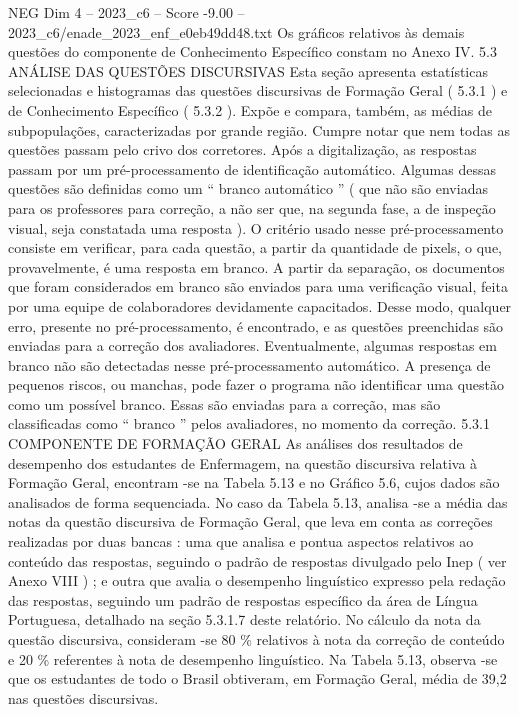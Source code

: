 \begin{textsample}{NEG Dim 4 – 2023\_c6 – Score -9.00 – 2023\_c6/enade\_2023\_enf\_e0eb49dd48.txt}
Os gráficos relativos às demais questões do componente de Conhecimento Específico constam no Anexo IV. 5.3 ANÁLISE DAS QUESTÕES DISCURSIVAS Esta seção apresenta estatísticas selecionadas e histogramas das questões discursivas de Formação Geral ( 5.3.1 ) e de Conhecimento Específico ( 5.3.2 ).
Expõe e compara, também, as médias de subpopulações, caracterizadas por grande região.
Cumpre notar que nem todas as questões passam pelo crivo dos corretores.
Após a digitalização, as respostas passam por um pré-processamento de identificação automático.
Algumas dessas questões são definidas como um “ branco automático ” ( que não são enviadas para os professores para correção, a não ser que, na segunda fase, a de inspeção visual, seja constatada uma resposta ).
O critério usado nesse pré-processamento consiste em verificar, para cada questão, a partir da quantidade de pixels, o que, provavelmente, é uma resposta em branco.
A partir da separação, os documentos que foram considerados em branco são enviados para uma verificação visual, feita por uma equipe de colaboradores devidamente capacitados.
Desse modo, qualquer erro, presente no pré-processamento, é encontrado, e as questões preenchidas são enviadas para a correção dos avaliadores.
Eventualmente, algumas respostas em branco não são detectadas nesse pré-processamento automático.
A presença de pequenos riscos, ou manchas, pode fazer o programa não identificar uma questão como um possível branco.
Essas são enviadas para a correção, mas são classificadas como “ branco ” pelos avaliadores, no momento da correção. 5.3.1 COMPONENTE DE FORMAÇÃO GERAL As análises dos resultados de desempenho dos estudantes de Enfermagem, na questão discursiva relativa à Formação Geral, encontram -se na Tabela 5.13 e no Gráfico 5.6, cujos dados são analisados de forma sequenciada.
No caso da Tabela 5.13, analisa -se a média das notas da questão discursiva de Formação Geral, que leva em conta as correções realizadas por duas bancas : uma que analisa e pontua aspectos relativos ao conteúdo das respostas, seguindo o padrão de respostas divulgado pelo Inep ( ver Anexo VIII ) ; e outra que avalia o desempenho linguístico expresso pela redação das respostas, seguindo um padrão de respostas específico da área de Língua Portuguesa, detalhado na seção 5.3.1.7 deste relatório.
No cálculo da nota da questão discursiva, consideram -se 80 \% relativos à nota da correção de conteúdo e 20 \% referentes à nota de desempenho linguístico.
Na Tabela 5.13, observa -se que os estudantes de todo o Brasil obtiveram, em Formação Geral, média de 39,2 nas questões discursivas.

\end{textsample}
